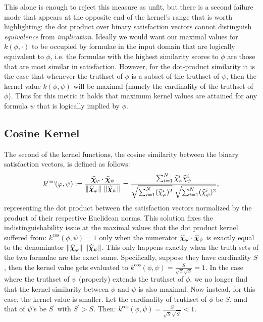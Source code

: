 \documentclass[titlepage,a4paper,11pt]{report}
\begin{document}
    This alone is enough to reject this measure as unfit, but there is a second failure mode that appears at the opposite end of the kernel's range that is worth highlighting: the dot product over binary satisfaction vectors cannot distinguish \emph{equivalence} from \emph{implication}. Ideally we would want our maximal values for $k(\phi,\cdot)$ to be occupied by formulae in the input domain that are logically equivalent to $\phi$, i.e. the formulae with the highest similarity scores to $\phi$ are those that are most similar in satisfaction. However, for the dot-product similarity it is the case that whenever the truthset of $\phi$ is a subset of the truthset of $\psi$, then the kernel value $k(\phi, \psi)$ will be maximal (namely the cardinality of the truthset of $\phi$). Thus for this metric it holds that maximum kernel values are attained for any formula $\psi$ that is logically implied by $\phi$.

    \subsection{Cosine Kernel}\label{eq:cosine_kernel}
    The second of the kernel functions, the cosine similarity between the binary satisfaction vectors, is defined as follows:
    \begin{equation}
        k^{\cos}(\varphi,\psi):= \frac{\bm{\widehat\chi}_\varphi \cdot \bm{\widehat\chi}_\psi}{\Vert \bm{\widehat\chi}_\varphi \Vert \mkern6mu \Vert \bm{\widehat\chi}_\psi \Vert} = \frac{\sum^N_{i=1} \widehat \chi^i_{\varphi} \widehat \chi^i_{\psi}}{\sqrt{\sum^N_{i=1} (\widehat \chi^i_{\varphi})^2} \mkern6mu \sqrt{\sum^N_{i=1} (\widehat \chi^i_{\psi})^2}},
    \end{equation}
    representing the dot product between the satisfaction vectors normalized by the product of their respective Euclidean norms. This solution fixes the indistinguishability issue at the maximal values that the dot product kernel suffered from: $k^{\cos}(\phi,\psi) = 1$ only when the numerator $\bm{\widehat\chi}_\varphi \cdot \bm{\widehat\chi}_\psi$ is exactly equal to the denominator $\Vert \bm{\widehat\chi}_\varphi \Vert \mkern6mu \Vert \bm{\widehat\chi}_\psi \Vert$. This only happens exactly when the truth sets of the two formulae are the exact same. Specifically, suppose they have cardinality $S$, then the kernel value gets evaluated to $k^{\cos}(\phi,\psi) = \frac{S}{\sqrt{S} \sqrt{S}} = 1$. In the case where the truthset of $\psi$ (properly) extends the truthset of $\phi$, we no longer find that the kernel similarity between $\phi$ and $\psi$ is also maximal. Now instead, for this case, the kernel value is smaller. Let the cardinality of truthset of $\phi$ be $S$, amd that of $\psi$'s be $S^\prime$ with $S^\prime > S$. Then: $k^{\cos}(\phi,\psi) = \frac{S}{\sqrt{S} \sqrt{S^\prime}} < 1$. 
\end{document}
